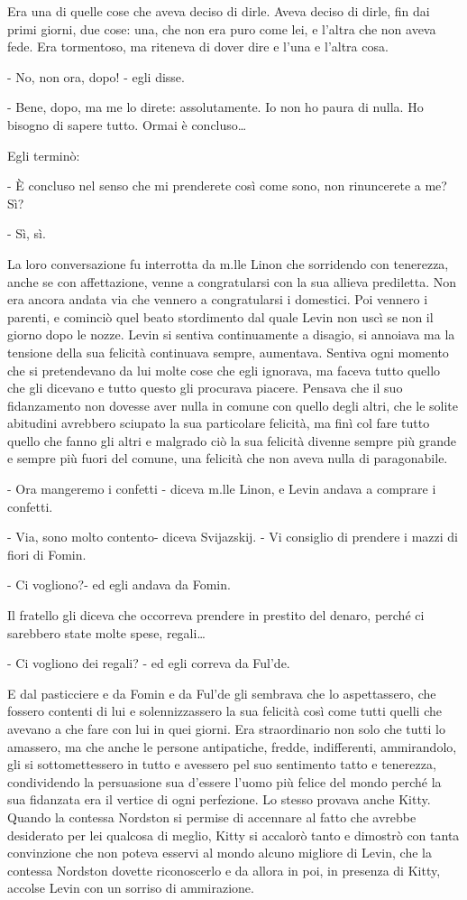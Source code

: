 Era una di quelle cose che aveva deciso di dirle. Aveva deciso di dirle, fin dai primi giorni, due cose: una, che non era puro come lei, e l'altra che non aveva fede. Era tormentoso, ma riteneva di dover dire e l'una e l'altra cosa. 

- No, non ora, dopo! - egli disse. 

- Bene, dopo, ma me lo direte: assolutamente. Io non ho paura di nulla. Ho bisogno di sapere tutto. Ormai è concluso\ldots{} 

Egli terminò: 

- È concluso nel senso che mi prenderete così come sono, non rinuncerete a me? Sì? 

- Sì, sì. 

La loro conversazione fu interrotta da m.lle Linon che sorridendo con tenerezza, anche se con affettazione, venne a congratularsi con la sua allieva prediletta. Non era ancora andata via che vennero a congratularsi i domestici. Poi vennero i parenti, e cominciò quel beato stordimento dal quale Levin non uscì se non il giorno dopo le nozze. Levin si sentiva continuamente a disagio, si annoiava ma la tensione della sua felicità continuava sempre, aumentava. Sentiva ogni momento che si pretendevano da lui molte cose che egli ignorava, ma faceva tutto quello che gli dicevano e tutto questo gli procurava piacere. Pensava che il suo fidanzamento non dovesse aver nulla in comune con quello degli altri, che le solite abitudini avrebbero sciupato la sua particolare felicità, ma finì col fare tutto quello che fanno gli altri e malgrado ciò la sua felicità divenne sempre più grande e sempre più fuori del comune, una felicità che non aveva nulla di paragonabile. 

- Ora mangeremo i confetti - diceva m.lle Linon, e Levin andava a comprare i confetti. 

- Via, sono molto contento- diceva Svijazskij. - Vi consiglio di prendere i mazzi di fiori di Fomin. 

- Ci vogliono?- ed egli andava da Fomin. 

Il fratello gli diceva che occorreva prendere in prestito del denaro, perché ci sarebbero state molte spese, regali\ldots{} 

- Ci vogliono dei regali? - ed egli correva da Ful'de. 

E dal pasticciere e da Fomin e da Ful'de gli sembrava che lo aspettassero, che fossero contenti di lui e solennizzassero la sua felicità così come tutti quelli che avevano a che fare con lui in quei giorni. Era straordinario non solo che tutti lo amassero, ma che anche le persone antipatiche, fredde, indifferenti, ammirandolo, gli si sottomettessero in tutto e avessero pel suo sentimento tatto e tenerezza, condividendo la persuasione sua d'essere l'uomo più felice del mondo perché la sua fidanzata era il vertice di ogni perfezione. Lo stesso provava anche Kitty. Quando la contessa Nordston si permise di accennare al fatto che avrebbe desiderato per lei qualcosa di meglio, Kitty si accalorò tanto e dimostrò con tanta convinzione che non poteva esservi al mondo alcuno migliore di Levin, che la contessa Nordston dovette riconoscerlo e da allora in poi, in presenza di Kitty, accolse Levin con un sorriso di ammirazione. 

